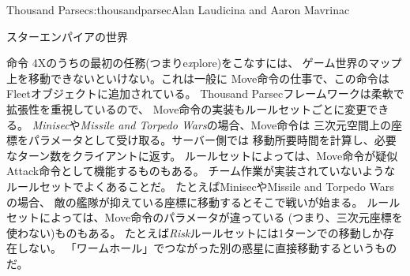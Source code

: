\begin{aosachapter}{Thousand Parsec}{s:thousandparsec}{Alan Laudicina and Aaron Mavrinac}
\begin{aosasect1}{スターエンパイアの世界}
\begin{aosasect2}{命令}
4Xのうちの最初の任務(つまりe\emph{x}plore)をこなすには、
ゲーム世界のマップ上を移動できないといけない。これは一般に
Move命令の仕事で、この命令はFleetオブジェクトに追加されている。
Thousand Parsecフレームワークは柔軟で拡張性を重視しているので、
Move命令の実装もルールセットごとに変更できる。
\emph{Minisec}や\emph{Missile and Torpedo Wars}の場合、Move命令は
三次元空間上の座標をパラメータとして受け取る。サーバー側では
移動所要時間を計算し、必要なターン数をクライアントに返す。
ルールセットによっては、Move命令が疑似Attack命令として機能するものもある。
チーム作業が実装されていないようなルールセットでよくあることだ。
たとえばMinisecやMissile and Torpedo Warsの場合、
敵の艦隊が抑えている座標に移動するとそこで戦いが始まる。
ルールセットによっては、Move命令のパラメータが違っている
(つまり、三次元座標を使わない)ものもある。
たとえば\emph{Risk}ルールセットには1ターンでの移動しか存在しない。
「ワームホール」でつながった別の惑星に直接移動するというものだ。


\end{aosasect2}
\end{aosasect1}
\end{aosachapter}
